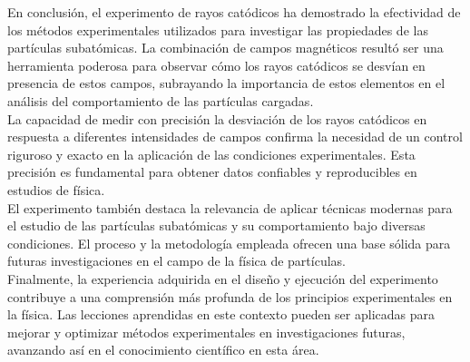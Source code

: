 En conclusión, el experimento de rayos catódicos ha demostrado la efectividad de los métodos experimentales utilizados para investigar
 las propiedades de las partículas subatómicas. La combinación de campos magnéticos resultó ser una herramienta poderosa para observar 
 cómo los rayos catódicos se desvían en presencia de estos campos, subrayando la importancia de estos elementos en el análisis del 
 comportamiento de las partículas cargadas.\\

La capacidad de medir con precisión la desviación de los rayos catódicos en respuesta a diferentes intensidades de campos confirma
 la necesidad de un control riguroso y exacto en la aplicación de las condiciones experimentales. Esta precisión es fundamental para 
 obtener datos confiables y reproducibles en estudios de física.\\

El experimento también destaca la relevancia de aplicar técnicas modernas para el estudio de las partículas subatómicas y su comportamiento
 bajo diversas condiciones. El proceso y la metodología empleada ofrecen una base sólida para futuras investigaciones en el campo de la física 
 de partículas.\\

Finalmente, la experiencia adquirida en el diseño y ejecución del experimento contribuye a una comprensión más profunda de los principios
 experimentales en la física. Las lecciones aprendidas en este contexto pueden ser aplicadas para mejorar y optimizar métodos experimentales 
 en investigaciones futuras, avanzando así en el conocimiento científico en esta área.
